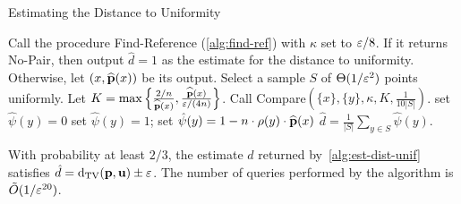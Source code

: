 \begin{algorithm}[ht!]
\caption{Estimating the Distance to Uniformity}\label{alg:est-dist-unif}
\begin{algorithmic}[1]
\State Call the procedure {\sc Find-Reference} (\cref{alg:find-ref})
with $\kappa$ set to $\varepsilon/8$.
If it returns {\sf No-Pair}, then output $\hat{d} = 1$ as the estimate for the
distance to uniformity. Otherwise, let $(x,\widehat{\mathbf{p}}(x))$ be its
output.
\State Select a sample $S$ of $\Theta(1/\varepsilon^2)$ points uniformly.
\State Let
$K = \max\left\{\frac{2/n}{\widehat{\mathbf{p}}(x)},
           \frac{\widehat{\mathbf{p}}(x)}{\varepsilon/(4n)}\right\}$.
  \State Call {\sc Compare}$\left(\{x\},\{y\},\kappa,K,\frac{1}{10|S|}\right)$.
      \State set $\hat{\psi}(y) = 0$
      \State set $\hat{\psi}(y) = 1$;
   \Else
      \State set $\hat{\psi}(y) = 1-n\cdot \rho(y)\cdot \widehat{\mathbf{p}}(x)$
   \EndIf
 \EndFor
\State\Return $\hat{d} = \frac{1}{|S|}\sum_{y\in S}\hat{\psi}(y)$.
\end{algorithmic}
\end{algorithm}



\begin{theorem}\label{thm:est-dist-unif}
With probability at least $2/3$,  the
estimate $\hat{d}$ returned by~\cref{alg:est-dist-unif}
satisfies $\hat{d}=\operatorname{d}_{\rm{TV}}(\mathbf{p},\mathbf{u}) \pm \varepsilon$.
The number of queries performed by the algorithm
is $\tilde{O}(1/\varepsilon^{20})$.
\end{theorem}

